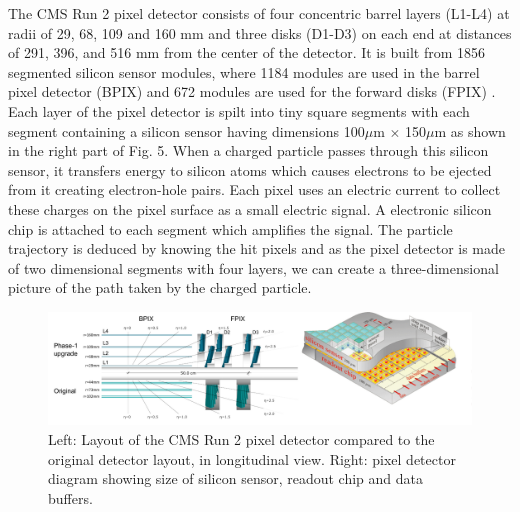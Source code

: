 The CMS Run 2 pixel detector consists of four concentric barrel layers (L1-L4) at radii of 29, 68, 109 and 160 mm and three disks (D1-D3) on each end at distances of 291, 396, and 516 mm from the center of the detector. It is built from 1856 segmented silicon sensor modules, where 1184 modules are used in the barrel pixel detector (BPIX) and 672 modules are used for the forward disks (FPIX) . \\

Each layer of the pixel detector is spilt into tiny square segments with each segment containing a silicon sensor having dimensions 100$\mu$m $\times$ 150$\mu$m as shown in the right part of Fig. 5. When a charged particle passes through this silicon sensor, it transfers energy to silicon atoms which causes electrons to be ejected from it creating electron-hole pairs. Each pixel uses an electric current to collect these charges on the pixel surface as a small electric signal. A electronic silicon chip is attached to each segment which amplifies the signal. The particle trajectory is deduced by knowing the hit pixels and as the pixel detector is made of two dimensional segments with four layers, we can create a three-dimensional picture of the path taken by the charged particle.



\begin{figure}[H]
  \centering
  \includegraphics[width=1 \columnwidth]{./pixeldetector_merged1.png}
  \caption{ \onehalfspacing Left: Layout of the CMS Run 2 pixel detector compared to the original detector layout, in longitudinal view. Right: pixel detector diagram showing size of silicon sensor, readout chip and data buffers. \cite{TrackerGroupoftheCMS:2020bgg}}
  \label{fig:LHC}
\end{figure}


